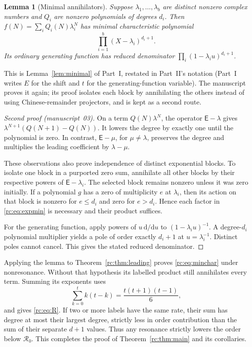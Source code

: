 \documentclass[11pt,a4paper]{article}
\numberwithin{equation}{section}
\newtheorem{lemma}[theorem]{Lemma}
\theoremstyle{definition}
\theoremstyle{remark}
\newcommand{\dd}{\mathrm d}
\newcommand{\E}{\mathsf E}
\newcommand{\Rzero}{\mathcal R_0}
\begin{document}
\begin{lemma}[Minimal annihilators]\label{rc:lem:annihilator}
Suppose $\lambda_1,\ldots,\lambda_b$ are distinct nonzero complex numbers
and $Q_i$ are nonzero polynomials of degrees $d_i$.  Then
$f(N)=\sum_i Q_i(N)\lambda_i^N$ has minimal characteristic polynomial
\begin{equation}\label{rc:eq:expmin}
 \prod_{i=1}^{b}(X-\lambda_i)^{d_i+1}.
\end{equation}
Its ordinary generating function has reduced denominator
$\prod_i(1-\lambda_i u)^{d_i+1}$.
\end{lemma}
This is Lemma~\ref{lem:minimal} of Part~I, restated in Part~II's
notation (Part~I writes $E$ for the shift and $t$ for the
generating-function variable).  The manuscript proves it again; its
proof isolates each block by annihilating the others instead of using
Chinese-remainder projectors, and is kept as a second route.
\begin{proof}[Second proof (manuscript~03)]
On a term $Q(N)\lambda^N$, the operator $\E-\lambda$ gives
$\lambda^{N+1}(Q(N+1)-Q(N))$.  It lowers the degree by exactly one
until the polynomial is zero.  In contrast, $\E-\mu$, for
$\mu\ne\lambda$, preserves the degree and multiplies the leading
coefficient by $\lambda-\mu$.

These observations also prove independence of distinct exponential
blocks.  To isolate one block in a purported zero sum, annihilate all
other blocks by their respective powers of $\E-\lambda_i$.
The selected block remains nonzero unless it was zero initially.
If a polynomial $g$ has a zero of multiplicity $e$ at $\lambda_i$,
then its action on that block is nonzero for $e\le d_i$ and zero
for $e>d_i$.  Hence each factor in \eqref{rc:eq:expmin} is necessary
and their product suffices.

For the generating function, apply powers of $u\,\dd/\dd u$ to
$(1-\lambda_i u)^{-1}$.  A degree-$d_i$ polynomial multiplier yields
a pole of order exactly $d_i+1$ at $u=\lambda_i^{-1}$.
Distinct poles cannot cancel.  This gives the stated reduced denominator.
\end{proof}

Applying the lemma to Theorem~\ref{rc:thm:leading} proves
\eqref{rc:eq:minchar} under nonresonance.  Without that hypothesis its
labelled product still annihilates every term.  Summing its exponents
uses
\begin{equation}\label{rc:eq:ksum}
 \sum_{k=0}^{t}k(t-k)=\frac{t(t+1)(t-1)}6,
\end{equation}
and gives \eqref{rc:eq:R}.  If two or more labels have the same rate,
their sum has degree at most their largest degree, strictly less in
order contribution than the sum of their separate $d+1$ values.
Thus any resonance strictly lowers the order below $\Rzero$.
This completes the proof of Theorem~\ref{rc:thm:main} and its corollaries.
\end{document}

